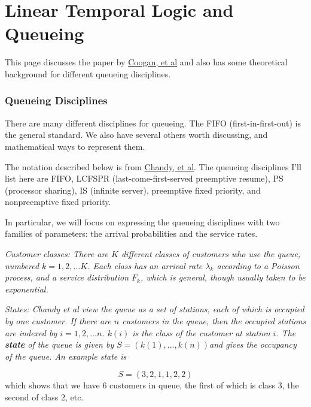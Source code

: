 \documentclass[12pt,titlepage]{article}
\theoremstyle{plain}
\theoremstyle{definition}
\theoremstyle{remark}
\begin{document}

\section*{Linear Temporal Logic and Queueing}

This page discusses the paper by \href{http://sites.bu.edu/hyness/files/2016/02/coogan2015trafficltl.pdf}{Coogan, et al} and also has some theoretical background for different queueing disciplines.

\hypertarget{queueing_disciplines}{}\subsubsection*{{Queueing Disciplines}}\label{queueing_disciplines}

There are many different disciplines for queueing. The FIFO (first-in-first-out) is the general standard. We also have several others worth discussing, and mathematical ways to represent them.

The notation described below is from \href{https://dl.acm.org/doi/10.1145/322003.322009}{Chandy, et al}. The queueing disciplines I'll list here are FIFO, LCFSPR (last-come-first-served preemptive resume), PS (processor sharing), IS (infinite server), preemptive fixed priority, and nonpreemptive fixed priority.

In particular, we will focus on expressing the queueing disciplines with two families of parameters: the arrival probabilities and the service rates.

\emph{Customer classes: There are $K$ different classes of customers who use the queue, numbered $k = 1,2,\ldots K$. Each class has an arrival rate $\lambda_{k}$ according to a Poisson process, and a service distribution $F_{k}$, which is general, though usually taken to be exponential.}

\emph{States: Chandy et al view the queue as a set of stations, each of which is occupied by one customer. If there are $n$ customers in the queue, then the occupied stations are indexed by $i=1,2,\ldots n$. $k(i)$ is the class of the customer at station $i$. The \textbf{state} of the queue is given by $S = (k(1),\ldots,k(n))$and gives the occupancy of the queue. An example state is}

\begin{displaymath}
S = (3,2,1,1,2,2)
\end{displaymath}
which shows that we have 6 customers in queue, the first of which is class 3, the second of class 2, etc.
\end{document}
